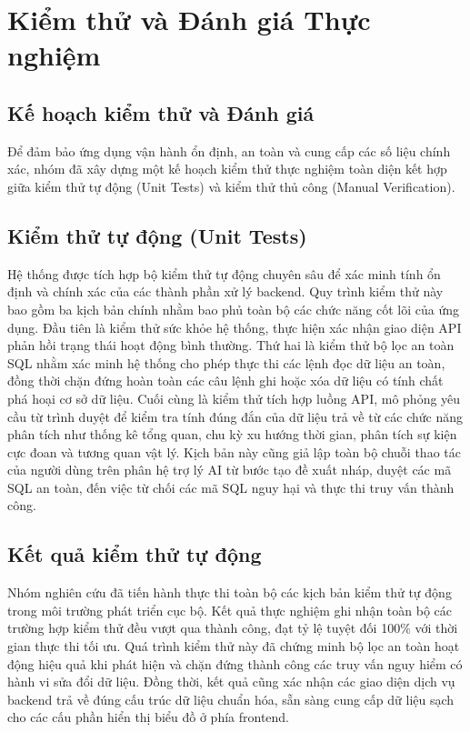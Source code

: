 \chapter{Kiểm thử và Đánh giá Thực nghiệm}

\section{Kế hoạch kiểm thử và Đánh giá}
Để đảm bảo ứng dụng vận hành ổn định, an toàn và cung cấp các số liệu chính xác, nhóm đã xây dựng một kế hoạch kiểm thử thực nghiệm toàn diện kết hợp giữa kiểm thử tự động (Unit Tests) và kiểm thử thủ công (Manual Verification).

\section{Kiểm thử tự động (Unit Tests)}
Hệ thống được tích hợp bộ kiểm thử tự động chuyên sâu để xác minh tính ổn định và chính xác của các thành phần xử lý backend. Quy trình kiểm thử này bao gồm ba kịch bản chính nhằm bao phủ toàn bộ các chức năng cốt lõi của ứng dụng. Đầu tiên là kiểm thử sức khỏe hệ thống, thực hiện xác nhận giao diện API phản hồi trạng thái hoạt động bình thường. Thứ hai là kiểm thử bộ lọc an toàn SQL nhằm xác minh hệ thống cho phép thực thi các lệnh đọc dữ liệu an toàn, đồng thời chặn đứng hoàn toàn các câu lệnh ghi hoặc xóa dữ liệu có tính chất phá hoại cơ sở dữ liệu. Cuối cùng là kiểm thử tích hợp luồng API, mô phỏng yêu cầu từ trình duyệt để kiểm tra tính đúng đắn của dữ liệu trả về từ các chức năng phân tích như thống kê tổng quan, chu kỳ xu hướng thời gian, phân tích sự kiện cực đoan và tương quan vật lý. Kịch bản này cũng giả lập toàn bộ chuỗi thao tác của người dùng trên phân hệ trợ lý AI từ bước tạo đề xuất nháp, duyệt các mã SQL an toàn, đến việc từ chối các mã SQL nguy hại và thực thi truy vấn thành công.

\section{Kết quả kiểm thử tự động}
Nhóm nghiên cứu đã tiến hành thực thi toàn bộ các kịch bản kiểm thử tự động trong môi trường phát triển cục bộ. Kết quả thực nghiệm ghi nhận toàn bộ các trường hợp kiểm thử đều vượt qua thành công, đạt tỷ lệ tuyệt đối 100\% với thời gian thực thi tối ưu. Quá trình kiểm thử này đã chứng minh bộ lọc an toàn hoạt động hiệu quả khi phát hiện và chặn đứng thành công các truy vấn nguy hiểm có hành vi sửa đổi dữ liệu. Đồng thời, kết quả cũng xác nhận các giao diện dịch vụ backend trả về đúng cấu trúc dữ liệu chuẩn hóa, sẵn sàng cung cấp dữ liệu sạch cho các cấu phần hiển thị biểu đồ ở phía frontend.

